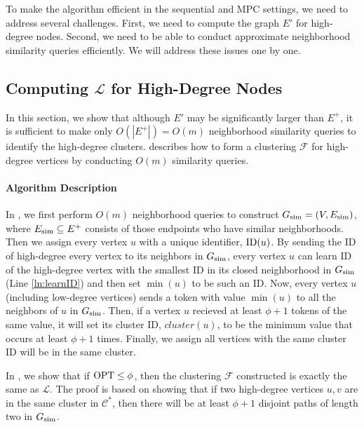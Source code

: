 To make the algorithm efficient in the sequential and MPC settings, we need to address several challenges. First, we need to compute the graph $E'$ for high-degree nodes. Second, we need to be able to conduct approximate neighborhood similarity queries efficiently. We will address these issues one by one.

\subsection{Computing $\mathcal{L}$ for High-Degree Nodes}

In this section, we show that although $E'$ may be significantly larger than $E^{+}$, it is sufficient to make only $O(|E^{+}|) = O(m)$ neighborhood similarity queries to identify the high-degree clusters.  describes how to form a clustering $\mathcal{F}$ for high-degree vertices by conducting $O(m)$ similarity queries. 

\paragraph{Algorithm Description} In , we first perform $O(m)$ neighborhood queries to construct $G_{\operatorname{sim}} = (V, E_{\operatorname{sim}})$, where $E_{\operatorname{sim}} \subseteq E^{+}$ consists of those endpoints who have similar neighborhoods. Then we assign every vertex $u$ with a unique identifier, $\operatorname{\text{{\rm ID}}}(u)$. By sending the ID of high-degree every vertex to its neighbors in $G_{\operatorname{sim}}$, every vertex $u$ can learn ID of the high-degree vertex with the smallest ID in its closed neighborhood in $G_{\operatorname{sim}}$ (Line \ref{ln:learnID}) and then set $\min(u)$ to be such an ID. Now, every vertex $u$ (including low-degree vertices) sends a token with value $\min(u)$ to all the neighbors of $u$ in $G_{\operatorname{sim}}$. Then, if a vertex $u$ recieved at least $\phi + 1$ tokens of the same value, it will set its cluster ID, $cluster(u)$, to be the minimum value that occurs at least $\phi + 1$ times. Finally, we assign all vertices with the same cluster ID will be in the same cluster. 

In , we show that if $\mathrm{OPT} \leq \phi$, then the clustering $\mathcal{F}$ constructed is exactly the same as $\mathcal{L}$. The proof is based on showing that if two high-degree vertices $u,v$ are in the same cluster in $\mathcal{C}^{*}$, then there will be at least $\phi + 1$ disjoint paths of length two in $G_{\operatorname{sim}}$. 




